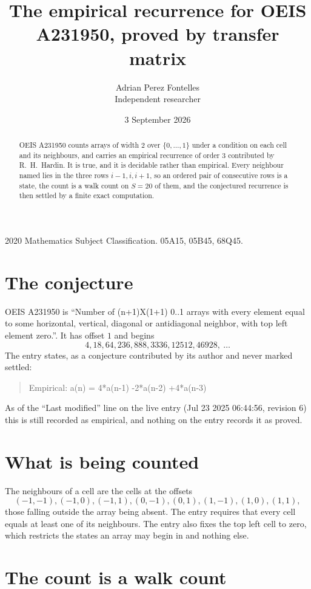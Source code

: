 \documentclass[11pt,a4paper]{article}
\title{The empirical recurrence for OEIS A231950, proved by transfer matrix}
\author{Adrian Perez Fontelles\\ \small Independent researcher}
\date{3 September 2026}
\theoremstyle{plain}
\theoremstyle{definition}
\begin{document}
\maketitle

\begin{abstract}
OEIS A231950 counts arrays of width $2$ over $\{0,\dots,1\}$ under a condition on each cell
and its neighbours, and carries an empirical recurrence of order $3$ contributed by
R.~H.~Hardin. It is true, and it is decidable rather than empirical. Every neighbour named lies
in the three rows $i-1,i,i+1$, so an ordered pair of consecutive rows is a state, the count is
a walk count on $S=20$ of them, and the conjectured recurrence is then settled by a finite
exact computation.
\end{abstract}

\noindent\small 2020 Mathematics Subject Classification. 05A15, 05B45, 68Q45.\normalsize

\section{The conjecture}

OEIS A231950 is ``Number of (n+1)X(1+1) 0..1 arrays with every element equal to some horizontal, vertical, diagonal or antidiagonal neighbor, with top left element zero.''. It has offset $1$ and begins
\[
4, 18, 64, 236, 888, 3336, 12512, 46928,\ \dots
\]
The entry states, as a conjecture contributed by its author and never marked settled:
\begin{quote}
Empirical: a(n) = 4*a(n-1) -2*a(n-2) +4*a(n-3)
\end{quote}
As of the ``Last modified'' line on the live entry (Jul 23 2025 06:44:56, revision 6) this is still
recorded as empirical, and nothing on the entry records it as proved.

\section{What is being counted}

The neighbours of a cell are the cells at the offsets
\[
(-1,-1), (-1,0), (-1,1), (0,-1), (0,1), (1,-1), (1,0), (1,1),
\]
those falling outside the array being absent. The entry requires that every cell equals at least one of its neighbours. The entry also fixes the top left cell to zero, which restricts the states an array may begin in and nothing else.

\section{The count is a walk count}
\end{document}
